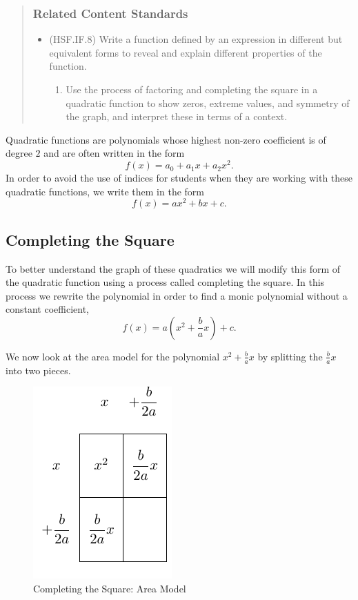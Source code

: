\documentclass[
]{book}
\providecommand{\tightlist}{%
  \setlength{\itemsep}{0pt}\setlength{\parskip}{0pt}}
\theoremstyle{definition}
\theoremstyle{definition}
\theoremstyle{definition}
\theoremstyle{remark}
\begin{document}
\begin{quote}
\hypertarget{related-content-standards-47}{%
\subsubsection*{Related Content Standards}\label{related-content-standards-47}}

\begin{itemize}
\tightlist
\item
  (HSF.IF.8) Write a function defined by an expression in different but equivalent forms to reveal and explain different properties of the function.

  \begin{enumerate}
  \def\labelenumi{\alph{enumi}.}
  \tightlist
  \item
    Use the process of factoring and completing the square in a quadratic function to show zeros, extreme values, and symmetry of the graph, and interpret these in terms of a context.
  \end{enumerate}
\end{itemize}
\end{quote}

Quadratic functions are polynomials whose highest non-zero coefficient is of degree \(2\) and are often written in the form \[f(x)=a_0 + a_1 x + a_2 x^2.\] In order to avoid the use of indices for students when they are working with these quadratic functions, we write them in the form
\[f(x)=ax^2 + bx +c.\]

\hypertarget{completing-the-square}{%
\subsection{Completing the Square}\label{completing-the-square}}

To better understand the graph of these quadratics we will modify this form of the quadratic function using a process called completing the square. In this process we rewrite the polynomial in order to find a monic polynomial without a constant coefficient,
\[f(x) = a \left( x^2 +\frac{b}{a}x \right) + c.\]

We now look at the area model for the polynomial \(x^2+\frac{b}{a}x\) by splitting the \(\frac{b}{a}x\) into two pieces.

\begin{figure}

{\centering \includegraphics[width=0.2\linewidth]{tikz/completing-square} 

}

\caption{Completing the Square: Area Model}\label{fig:unnamed-chunk-214}
\end{figure}
\end{document}
